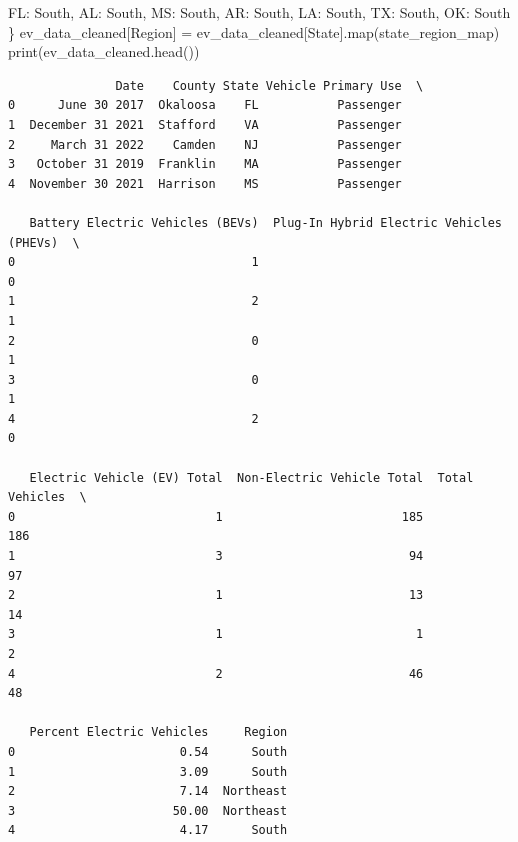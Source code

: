 \documentclass[
  letterpaper,
  DIV=11,
  numbers=noendperiod]{scrartcl}
\newenvironment{Shaded}{\begin{snugshade}}{\end{snugshade}}
\newcommand{\BuiltInTok}[1]{\textcolor[rgb]{0.00,0.23,0.31}{#1}}
\newcommand{\NormalTok}[1]{\textcolor[rgb]{0.00,0.23,0.31}{#1}}
\newcommand{\OperatorTok}[1]{\textcolor[rgb]{0.37,0.37,0.37}{#1}}
\newcommand{\StringTok}[1]{\textcolor[rgb]{0.13,0.47,0.30}{#1}}
\begin{document}
\begin{Shaded}
\begin{Highlighting}[]
    \StringTok{\textquotesingle{}FL\textquotesingle{}}\NormalTok{: }\StringTok{\textquotesingle{}South\textquotesingle{}}\NormalTok{, }\StringTok{\textquotesingle{}AL\textquotesingle{}}\NormalTok{: }\StringTok{\textquotesingle{}South\textquotesingle{}}\NormalTok{, }\StringTok{\textquotesingle{}MS\textquotesingle{}}\NormalTok{: }\StringTok{\textquotesingle{}South\textquotesingle{}}\NormalTok{, }\StringTok{\textquotesingle{}AR\textquotesingle{}}\NormalTok{: }\StringTok{\textquotesingle{}South\textquotesingle{}}\NormalTok{, }\StringTok{\textquotesingle{}LA\textquotesingle{}}\NormalTok{: }\StringTok{\textquotesingle{}South\textquotesingle{}}\NormalTok{, }\StringTok{\textquotesingle{}TX\textquotesingle{}}\NormalTok{: }\StringTok{\textquotesingle{}South\textquotesingle{}}\NormalTok{, }\StringTok{\textquotesingle{}OK\textquotesingle{}}\NormalTok{: }\StringTok{\textquotesingle{}South\textquotesingle{}}
\NormalTok{\}}
\NormalTok{ev\_data\_cleaned[}\StringTok{\textquotesingle{}Region\textquotesingle{}}\NormalTok{] }\OperatorTok{=}\NormalTok{ ev\_data\_cleaned[}\StringTok{\textquotesingle{}State\textquotesingle{}}\NormalTok{].}\BuiltInTok{map}\NormalTok{(state\_region\_map)}
\BuiltInTok{print}\NormalTok{(ev\_data\_cleaned.head())}
\end{Highlighting}
\end{Shaded}

\begin{verbatim}
               Date    County State Vehicle Primary Use  \
0      June 30 2017  Okaloosa    FL           Passenger   
1  December 31 2021  Stafford    VA           Passenger   
2     March 31 2022    Camden    NJ           Passenger   
3   October 31 2019  Franklin    MA           Passenger   
4  November 30 2021  Harrison    MS           Passenger   

   Battery Electric Vehicles (BEVs)  Plug-In Hybrid Electric Vehicles (PHEVs)  \
0                                 1                                         0   
1                                 2                                         1   
2                                 0                                         1   
3                                 0                                         1   
4                                 2                                         0   

   Electric Vehicle (EV) Total  Non-Electric Vehicle Total  Total Vehicles  \
0                            1                         185             186   
1                            3                          94              97   
2                            1                          13              14   
3                            1                           1               2   
4                            2                          46              48   

   Percent Electric Vehicles     Region  
0                       0.54      South  
1                       3.09      South  
2                       7.14  Northeast  
3                      50.00  Northeast  
4                       4.17      South  
\end{verbatim}
\end{document}
